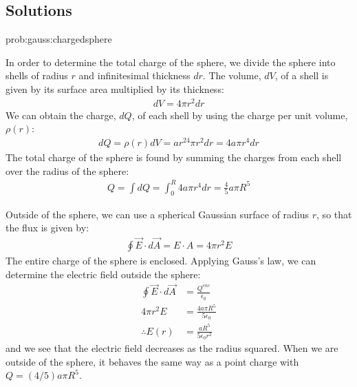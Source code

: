 \newpage
\subsection{Solutions}
\begin{solutionParts}{prob:gauss:chargedsphere}
{\label{soln:gauss:chargedsphere}
\item In order to determine the total charge of the sphere, we divide the sphere into shells of radius $r$ and infinitesimal thickness $dr$. The volume, $dV$, of a shell is given by its surface area multiplied by its thickness:
\begin{align*}
dV = 4\pi r^2 dr
\end{align*}
We can obtain the charge, $dQ$, of each shell by using the charge per unit volume, $\rho(r)$:
\begin{align*}
dQ = \rho(r) dV = ar^24\pi r^2 dr = 4a\pi r^4 dr
\end{align*}
The total charge of the sphere is found by summing the charges from each shell over the radius of the sphere:
\begin{align*}
Q=\int dQ =\int_0^R4a\pi r^4 dr=\frac{4}{5}a\pi R^5
\end{align*}
\item Outside of the sphere, we can use a spherical Gaussian surface of radius $r$, so that the flux is given by:
\begin{align*}
\oint \vec E\cdot d\vec A=E\cdot A=4\pi r^2 E
\end{align*}
The entire charge of the sphere is enclosed. Applying Gauss's law, we can determine the electric field outside the sphere:
\begin{align*}
\oint \vec E\cdot d\vec A&= \frac{Q^{enc}}{\epsilon_0}\\
4\pi r^2 E&= \frac{4a\pi R^5}{5\epsilon_0}\\
\therefore E(r)&=\frac{aR^5}{5\epsilon_0r^2}
\end{align*}
and we see that the electric field decreases as the radius squared. When we are outside of the sphere, it behaves the same way as a point charge with $Q=(4/5)a\pi R^5$.

}
\end{solutionParts}
